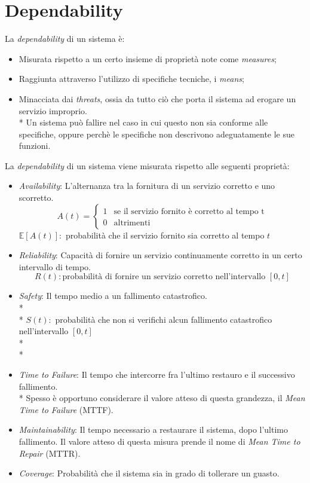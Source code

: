 \section{Dependability}
La \emph{dependability} di un sistema \`e:
\begin{itemize}
	\item Misurata rispetto a un certo insieme di propriet\`a note come \emph{measures};
	\item Raggiunta attraverso l'utilizzo di specifiche tecniche, i \emph{means};
	\item Minacciata dai \emph{threats}, ossia da tutto ci\`o che porta il sistema ad erogare un servizio improprio.\\*
	Un sistema pu\`o fallire nel caso in cui questo non sia conforme alle specifiche, oppure perch\`e le specifiche non descrivono adeguatamente le sue funzioni.
\end{itemize}
La \emph{dependability} di un sistema viene misurata rispetto alle seguenti propriet\`a:
\begin{itemize}
	\item \emph{Availability}: L'alternanza tra la fornitura di un servizio corretto e uno scorretto.
	$$
	A(t) = \begin{cases} 1 & \mbox{se il servizio fornito \`e corretto al tempo t} \\ 0 & \mbox{altrimenti} \end{cases}
	$$
	$\mathbb E[A(t)]:$ probabilit\`a che il servizio fornito sia corretto al tempo $t$
	\item \emph{Reliability}: Capacit\`a di fornire un servizio continuamente corretto in un certo intervallo di tempo.
	$$
	R(t):\mbox{probabilit\`a di fornire un servizio corretto nell'intervallo }[0,t]
	$$
	\item \emph{Safety}: Il tempo medio a un fallimento catastrofico.\\*\\*
	$S(t):$ probabilit\`a che non si verifichi alcun fallimento catastrofico nell'intervallo $[0,t]$\\*\\*
	\item \emph{Time to Failure}: Il tempo che intercorre fra l'ultimo restauro e il successivo fallimento.\\*
	Spesso \`e opportuno considerare il valore atteso di questa grandezza, il \emph{Mean Time to Failure} (MTTF).
	\item \emph{Maintainability}: Il tempo necessario a restaurare il sistema, dopo l'ultimo fallimento. Il valore atteso di questa misura prende il nome di \emph{Mean Time to Repair} (MTTR).
	\item \emph{Coverage}: Probabilit\`a che il sistema sia in grado di tollerare un guasto.
\end{itemize}
